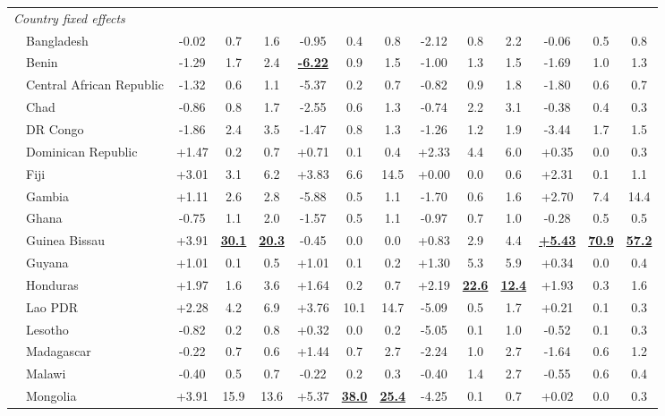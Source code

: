 \begin{landscape}
\begin{table}[p]
\begin{adjustbox}{max width=\textwidth,center}
\begin{tabular}{ll*{12}{c}}
\multicolumn{14}{l}{\textit{Country fixed effects}} \\
 & Bangladesh & -0.02 & 0.7 & 1.6 & -0.95 & 0.4 & 0.8 & -2.12 & 0.8 & 2.2 & -0.06 & 0.5 & 0.8 \\
 & Benin & -1.29 & 1.7 & 2.4 & \textbf{\underline{-6.22}} & 0.9 & 1.5 & -1.00 & 1.3 & 1.5 & -1.69 & 1.0 & 1.3 \\
 & Central African Republic & -1.32 & 0.6 & 1.1 & -5.37 & 0.2 & 0.7 & -0.82 & 0.9 & 1.8 & -1.80 & 0.6 & 0.7 \\
 & Chad & -0.86 & 0.8 & 1.7 & -2.55 & 0.6 & 1.3 & -0.74 & 2.2 & 3.1 & -0.38 & 0.4 & 0.3 \\
 & DR Congo & -1.86 & 2.4 & 3.5 & -1.47 & 0.8 & 1.3 & -1.26 & 1.2 & 1.9 & -3.44 & 1.7 & 1.5 \\
 & Dominican Republic & +1.47 & 0.2 & 0.7 & +0.71 & 0.1 & 0.4 & +2.33 & 4.4 & 6.0 & +0.35 & 0.0 & 0.3 \\
 & Fiji & +3.01 & 3.1 & 6.2 & +3.83 & 6.6 & 14.5 & +0.00 & 0.0 & 0.6 & +2.31 & 0.1 & 1.1 \\
 & Gambia & +1.11 & 2.6 & 2.8 & -5.88 & 0.5 & 1.1 & -1.70 & 0.6 & 1.6 & +2.70 & 7.4 & 14.4 \\
 & Ghana & -0.75 & 1.1 & 2.0 & -1.57 & 0.5 & 1.1 & -0.97 & 0.7 & 1.0 & -0.28 & 0.5 & 0.5 \\
 & Guinea Bissau & +3.91 & \textbf{\underline{30.1}} & \textbf{\underline{20.3}} & -0.45 & 0.0 & 0.0 & +0.83 & 2.9 & 4.4 & \textbf{\underline{+5.43}} & \textbf{\underline{70.9}} & \textbf{\underline{57.2}} \\
 & Guyana & +1.01 & 0.1 & 0.5 & +1.01 & 0.1 & 0.2 & +1.30 & 5.3 & 5.9 & +0.34 & 0.0 & 0.4 \\
 & Honduras & +1.97 & 1.6 & 3.6 & +1.64 & 0.2 & 0.7 & +2.19 & \textbf{\underline{22.6}} & \textbf{\underline{12.4}} & +1.93 & 0.3 & 1.6 \\
 & Lao PDR & +2.28 & 4.2 & 6.9 & +3.76 & 10.1 & 14.7 & -5.09 & 0.5 & 1.7 & +0.21 & 0.1 & 0.3 \\
 & Lesotho & -0.82 & 0.2 & 0.8 & +0.32 & 0.0 & 0.2 & -5.05 & 0.1 & 1.0 & -0.52 & 0.1 & 0.3 \\
 & Madagascar & -0.22 & 0.7 & 0.6 & +1.44 & 0.7 & 2.7 & -2.24 & 1.0 & 2.7 & -1.64 & 0.6 & 1.2 \\
 & Malawi & -0.40 & 0.5 & 0.7 & -0.22 & 0.2 & 0.3 & -0.40 & 1.4 & 2.7 & -0.55 & 0.6 & 0.4 \\
 & Mongolia & +3.91 & 15.9 & 13.6 & +5.37 & \textbf{\underline{38.0}} & \textbf{\underline{25.4}} & -4.25 & 0.1 & 0.7 & +0.02 & 0.0 & 0.3 \\

\end{tabular}
\end{adjustbox}
\end{table}
\end{landscape}
